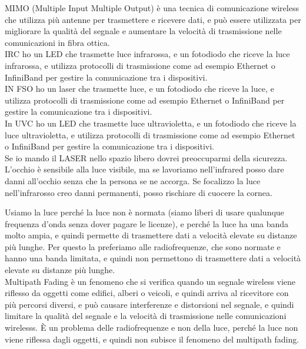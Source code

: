 MIMO (Multiple Input Multiple Output) è una tecnica di comunicazione wireless che utilizza più antenne per trasmettere e ricevere dati, e può essere utilizzata per migliorare la qualità del segnale e aumentare la velocità di trasmissione nelle comunicazioni in fibra ottica.\\

IRC ho un LED che trasmette luce infrarossa, e un fotodiodo che riceve la luce infrarossa, e utilizza protocolli di trasmissione come ad esempio Ethernet o InfiniBand per gestire la comunicazione tra i dispositivi.\\

IN FSO ho un laser che trasmette luce, e un fotodiodo che riceve la luce, e utilizza protocolli di trasmissione come ad esempio Ethernet o InfiniBand per gestire la comunicazione tra i dispositivi.\\

In UVC ho un LED che trasmette luce ultravioletta, e un fotodiodo che riceve la luce ultravioletta, e utilizza protocolli di trasmissione come ad esempio Ethernet o InfiniBand per gestire la comunicazione tra i dispositivi.\\

Se io mando il LASER nello spazio libero dovrei preoccuparmi della sicurezza. L'occhio è sensibile alla luce visibile, ma se lavoriamo nell'infrared posso dare danni all'occhio senza che la persona se ne accorga. Se focalizzo la luce nell'infrarosso creo danni permanenti, posso rischiare di cuocere la cornea.

Usiamo la luce perché la luce non è normata (siamo liberi di usare qualunque frequenza d'onda senza dover pagare le licenze), e perché la luce ha una banda molto ampia, e quindi permette di trasmettere dati a velocità elevate su distanze più lunghe. Per questo la preferiamo alle radiofrequenze, che sono normate e hanno una banda limitata, e quindi non permettono di trasmettere dati a velocità elevate su distanze più lunghe.\\

Multipath Fading è un fenomeno che si verifica quando un segnale wireless viene riflesso da oggetti come edifici, alberi o veicoli, e quindi arriva al ricevitore con più percorsi diversi, e può causare interferenze e distorsioni nel segnale, e quindi limitare la qualità del segnale e la velocità di trasmissione nelle comunicazioni wirelesss. È un problema delle radiofrequenze e non della luce, perché la luce non viene riflessa dagli oggetti, e quindi non subisce il fenomeno del multipath fading.\\

